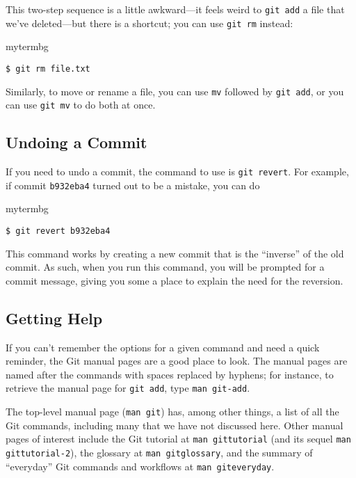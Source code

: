 This two-step sequence is a little awkward---it feels weird to \texttt{git add}
a file that we've deleted---but there is a shortcut; you can use \texttt{git
rm} instead:

\begin{tsession}{mytermbg}
\begin{verbatim}
$ git rm file.txt
\end{verbatim}
\end{tsession}

Similarly, to move or rename a file, you can use \texttt{mv} followed by
\texttt{git add}, or you can use \texttt{git mv} to do both at once.

\subsection{Undoing a Commit}

If you need to undo a commit, the command to use is \texttt{git revert}.  For
example, if commit \texttt{b932eba4} turned out to be a mistake, you can do

\begin{tsession}{mytermbg}
\begin{verbatim}
$ git revert b932eba4
\end{verbatim}
\end{tsession}

This command works by creating a new commit that is the ``inverse'' of the old
commit.  As such, when you run this command, you will be prompted for a commit
message, giving you some a place to explain the need for the reversion.

\subsection{Getting Help}

If you can't remember the options for a given command and need a quick
reminder, the Git manual pages are a good place to look.  The manual pages are
named after the commands with spaces replaced by hyphens; for instance, to
retrieve the manual page for \texttt{git add}, type \texttt{man git-add}.

The top-level manual page (\texttt{man git}) has, among other things, a list of
all the Git commands, including many that we have not discussed here.  Other
manual pages of interest include the Git tutorial at \texttt{man gittutorial}
(and its sequel \texttt{man gittutorial-2}), the glossary at \texttt{man
gitglossary}, and the summary of ``everyday'' Git commands and workflows at
\texttt{man giteveryday}.


